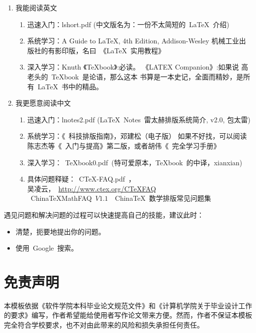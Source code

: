 \begin{enumerate}
\item 我能阅读英文
\begin{enumerate}
\item 迅速入门：lshort.pdf (中文版名为：一份不太简短的~\LaTeX{}~介绍)
\item 系统学习：A Guide to LaTeX, 4th Edition, Addison-Wesley
                机械工业出版社的有影印版，名曰~《\LaTeX{}~实用教程》
\item 深入学习：Knuth 《TeXbook》:必读。 《LATEX Companion》:如果说 高老头的~TeXbook~是论语，那么这本
               书算是一本史记，全面而精妙，是所有~\LaTeX~书中的精品。
\end{enumerate}

\item 我更愿意阅读中文
\begin{enumerate}
\item 迅速入门：lnotes2.pdf (\LaTeX~Notes~雷太赫排版系统简介, v2.0, 包太雷)
\item 系统学习：《\LaTeXe{}~科技排版指南》，邓建松（电子版）
      如果不好找，可以阅读陈志杰等《\LaTeXe~入门与提高》第二版，或者胡伟《\LaTeXe~完全学习手册》
\item 深入学习：~TeXbook0.pdf~(特可爱原本，TeXbook~的中译，xianxian)
\item 具体问题释疑：~CTeX-FAQ.pdf~，\\
        吴凌云，~\url{http://www.ctex.org/CTeXFAQ}~\\
      ~ChinaTeXMathFAQ~$V1.1$~~China\TeX~数学排版常见问题集
\end{enumerate}
\end{enumerate}

遇见问题和解决问题的过程可以快速提高自己的技能，建议此时：
\begin{itemize}
 \item 清楚，扼要地提出你的问题。
 \item 使用~Google~搜索。
\end{itemize}

\section{免责声明}

本模板依据《软件学院本科毕业论文规范文件》和《计算机学院关于毕业设计工作的要求》编写，作者希望能给使用者写作论文带来方便。然而，作者不保证本模板完全符合学校要求，也不对由此带来的风险和损失承担任何责任。
